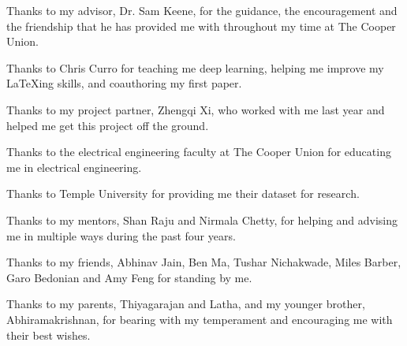 \begin{acknowledgements}
		
	Thanks to my advisor, Dr. Sam Keene, for the guidance, the encouragement and the friendship that he has provided me with throughout my time at The Cooper Union. 
		
	\smallskip
		
	Thanks to Chris Curro for teaching me deep learning, helping me improve my \LaTeX ing skills, and coauthoring my first paper. 
		
	\smallskip
		
	Thanks to my project partner, Zhengqi Xi, who worked with me last year and helped me get this project off the ground.
		
	\smallskip
		
	Thanks to the electrical engineering faculty at The Cooper Union for educating me in electrical engineering.
		
	\smallskip
	Thanks to Temple University for providing me their dataset for research. 
	
	\smallskip
	Thanks to my mentors, Shan Raju and Nirmala Chetty, for helping and advising me in multiple ways during the past four years. 
		
	\smallskip
		
	Thanks to my friends, Abhinav Jain, Ben Ma, Tushar Nichakwade, Miles Barber, Garo Bedonian and Amy Feng for standing by me. 
		
	\smallskip
		
	Thanks to my parents, Thiyagarajan and Latha, and my younger brother, Abhiramakrishnan, for bearing with my temperament and encouraging me with their best wishes. 
		
			
\end{acknowledgements}